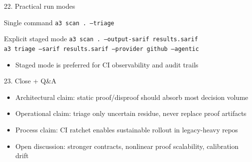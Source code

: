 \documentclass[aspectratio=169]{beamer}
\begin{document}
\begin{frame}[fragile]{22. Practical run modes}
\begin{block}{Single command}
\texttt{a3 scan . --triage}
\end{block}
\begin{block}{Explicit staged mode}
\texttt{a3 scan . --output-sarif results.sarif}\\
\texttt{a3 triage --sarif results.sarif --provider github --agentic}
\end{block}
\begin{itemize}
  \item Staged mode is preferred for CI observability and audit trails
\end{itemize}
\end{frame}

\begin{frame}{23. Close + Q\&A}
\begin{itemize}
  \item Architectural claim: static proof/disproof should absorb most decision volume
  \item Operational claim: triage only uncertain residue, never replace proof artifacts
  \item Process claim: CI ratchet enables sustainable rollout in legacy-heavy repos
  \item Open discussion: stronger contracts, nonlinear proof scalability, calibration drift
\end{itemize}
\end{frame}
\end{document}
